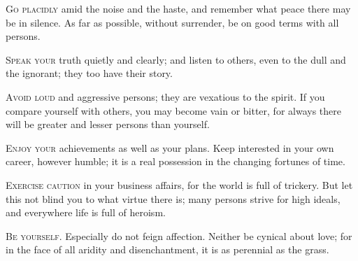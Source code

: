 \documentclass[fontsize=9, a5paper]{scrbook}
\begin{document}
\begin{poem}
	\begin{stanza}
		\textsc{Go placidly} amid the noise and the haste, \verseline
			\verseindent and remember what peace there may be \verseline
			\verseindent\verseindent in silence.\verseline
		 As far as possible, without surrender, \verseline
		\verseindent be on good terms with all persons.
	\end{stanza}
	
	\begin{stanza}
		\textsc{Speak your} truth quietly and clearly; \verseline
			\verseindent and listen to others, \verseline
			\verseindent even to the dull and the ignorant; \verseline
			\verseindent they too have their story.
	\end{stanza}
	
	\begin{stanza}
		\textsc{Avoid loud} and aggressive persons; \verseline
			\verseindent they are vexatious to the spirit. \verseline
		If you compare yourself with others, \verseline
			\verseindent you may become vain or bitter, \verseline
		\verseindent for always there will be \verseline
			\verseindent \verseindent greater and lesser \verseline
				\verseindent \verseindent\verseindent persons than yourself. 
	\end{stanza}
	
	\begin{stanza}
		\textsc{Enjoy your} achievements as well as your plans. \verseline
		Keep interested in your own career, however humble; \verseline
		it is a real possession in the changing fortunes of time.
	\end{stanza}
	
	\begin{stanza}
		\textsc{Exercise caution} in your business affairs, \verseline
			\verseindent for the world is full of trickery. \verseline
		But let this not blind you to what virtue there is; \verseline
			\verseindent many persons strive for high ideals, \verseline
			\verseindent and everywhere life is full of heroism.
	\end{stanza}
	
	\begin{stanza}
		\textsc{Be yourself.} \verseline
		Especially do not feign affection. \verseline
		Neither be cynical about love; \verseline
			\verseindent for in the face of all aridity \verseline
			\verseindent and disenchantment, \verseline
			\verseindent it is as perennial as the grass.
	\end{stanza}
	

\end{poem}
\end{document}
